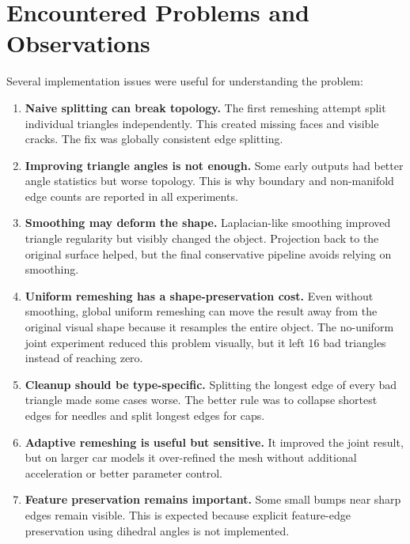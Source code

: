 \documentclass[11pt,a4paper]{article}
\begin{document}
\section{Encountered Problems and Observations}

Several implementation issues were useful for understanding the problem:

\begin{enumerate}
  \item \textbf{Naive splitting can break topology.} The first remeshing attempt split individual triangles independently. This created missing faces and visible cracks. The fix was globally consistent edge splitting.

  \item \textbf{Improving triangle angles is not enough.} Some early outputs had better angle statistics but worse topology. This is why boundary and non-manifold edge counts are reported in all experiments.

  \item \textbf{Smoothing may deform the shape.} Laplacian-like smoothing improved triangle regularity but visibly changed the object. Projection back to the original surface helped, but the final conservative pipeline avoids relying on smoothing.

  \item \textbf{Uniform remeshing has a shape-preservation cost.} Even without smoothing, global uniform remeshing can move the result away from the original visual shape because it resamples the entire object. The no-uniform joint experiment reduced this problem visually, but it left 16 bad triangles instead of reaching zero.

  \item \textbf{Cleanup should be type-specific.} Splitting the longest edge of every bad triangle made some cases worse. The better rule was to collapse shortest edges for needles and split longest edges for caps.

  \item \textbf{Adaptive remeshing is useful but sensitive.} It improved the joint result, but on larger car models it over-refined the mesh without additional acceleration or better parameter control.

  \item \textbf{Feature preservation remains important.} Some small bumps near sharp edges remain visible. This is expected because explicit feature-edge preservation using dihedral angles is not implemented.
\end{enumerate}
\end{document}
